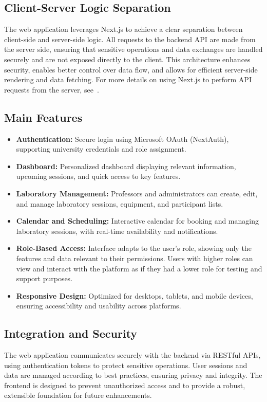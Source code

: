 \subsection{Client-Server Logic Separation}

The web application leverages Next.js to achieve a clear separation between client-side and server-side logic. All requests to the backend API are made from the server side, ensuring that sensitive operations and data exchanges are handled securely and are not exposed directly to the client. This architecture enhances security, enables better control over data flow, and allows for efficient server-side rendering and data fetching. For more details on using Next.js to perform API requests from the server, see~\cite{auth0-nextjs-server-actions}.

\subsection{Main Features}
\begin{itemize}
    \item \textbf{Authentication:} Secure login using Microsoft OAuth (NextAuth), supporting university credentials and role assignment.
    \item \textbf{Dashboard:} Personalized dashboard displaying relevant information, upcoming sessions, and quick access to key features.
    \item \textbf{Laboratory Management:} Professors and administrators can create, edit, and manage laboratory sessions, equipment, and participant lists.
    \item \textbf{Calendar and Scheduling:} Interactive calendar for booking and managing laboratory sessions, with real-time availability and notifications.
    \item \textbf{Role-Based Access:} Interface adapts to the user's role, showing only the features and data relevant to their permissions. Users with higher roles can view and interact with the platform as if they had a lower role for testing and support purposes.
    \item \textbf{Responsive Design:} Optimized for desktops, tablets, and mobile devices, ensuring accessibility and usability across platforms.
\end{itemize}

\subsection{Integration and Security}
The web application communicates securely with the backend via RESTful APIs, using authentication tokens to protect sensitive operations. User sessions and data are managed according to best practices, ensuring privacy and integrity. The frontend is designed to prevent unauthorized access and to provide a robust, extensible foundation for future enhancements. 